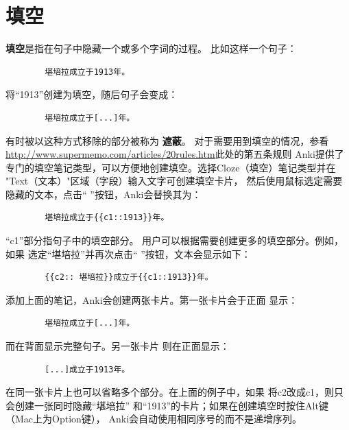 \documentclass[a4paper]{book}
\begin{document}
	\section{填空}\label{cloze}
	\textbf{填空}是指在句子中隐藏一个或多个字词的过程。 比如这样一个句子：
	\begin{shaded}\begin{verbatim}
		堪培拉成立于1913年。
		\end{verbatim}\end{shaded}
	将“1913”创建为填空，随后句子会变成：
	\begin{shaded}\begin{verbatim}
		堪培拉成立于[...]年。
		\end{verbatim}\end{shaded}
	有时被以这种方式移除的部分被称为
	\textbf{遮蔽}。
	对于需要用到填空的情况，参看\url{http://www.supermemo.com/articles/20rules.htm}此处的第五条规则
	Anki提供了专门的填空笔记类型，可以方便地创建填空。选择Cloze（填空）笔记类型并在 "Text（文本）"区域（字段）输入文字可创建填空卡片， 然后使用鼠标选定需要隐藏的文本，点击“
	”按钮，Anki会替换其为：
	\begin{shaded}\begin{verbatim}
		堪培拉成立于{{c1::1913}}年。
		\end{verbatim}\end{shaded}
	“c1”部分指句子中的填空部分。 用户可以根据需要创建更多的填空部分。例如，如果 选定“堪培拉”并再次点击“
	”按钮，文本会显示如下：
	\begin{shaded}\begin{verbatim}
		{{c2:: 堪培拉}}成立于{{c1::1913}}年。
		\end{verbatim}\end{shaded}
	添加上面的笔记，Anki会创建两张卡片。第一张卡片会于正面 显示：
	
	\begin{shaded}\begin{verbatim}
		堪培拉成立于[...]年。
		\end{verbatim}\end{shaded}
	而在背面显示完整句子。另一张卡片 则在正面显示：
	
	\begin{shaded}\begin{verbatim}
		[...]成立于1913年。
		\end{verbatim}\end{shaded}
	在同一张卡片上也可以省略多个部分。在上面的例子中，如果 将c2改成c1，则只会创建一张同时隐藏“堪培拉” 和“1913”的卡片；如果在创建填空时按住Alt键（Mac上为Option键）， Anki会自动使用相同序号的而不是递增序列。
	
\end{document}
